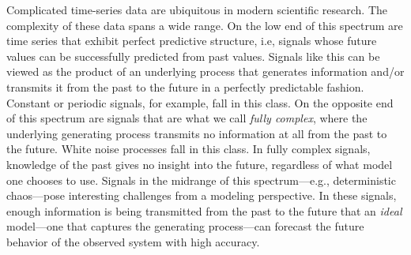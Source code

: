 



%

Complicated time-series data are ubiquitous in modern scientific
research.  The complexity of these data spans a wide range.  On the
low end of this spectrum are time series that exhibit perfect
predictive structure, i.e, signals whose future values can be
successfully predicted from past values.  Signals like this can be
viewed as the product of an underlying process that generates
information and/or transmits it from the past to the future in a
perfectly predictable fashion.  Constant or periodic signals, for
example, fall in this class.  On the opposite end of this spectrum are
signals that are what we call \emph{fully complex}, where the
underlying generating process transmits no information at all from the
past to the future.  White noise processes fall in
this class.  In fully complex signals, knowledge of the past gives no
insight into the future, regardless of what model one chooses to use.
Signals in the midrange of this spectrum---e.g., deterministic
chaos---pose interesting challenges from a modeling perspective.  In
these signals, enough information is being transmitted from the past
to the future that an \emph{ideal} model---one that captures the
generating process---can forecast the future behavior of the observed
system with high accuracy.

